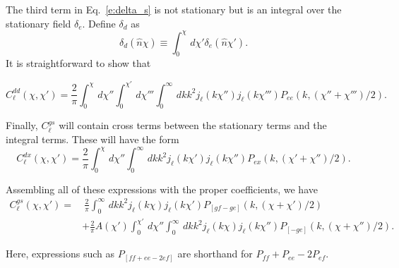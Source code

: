 \documentclass[twocolumn,nofootinbib,prl,floatfix]{revtex4-1}
\newcommand{\ud}{\,d}
\begin{document}
The third term in Eq.~\ref{e:delta_s} is not stationary but is an integral
over the stationary field $\delta_e$.
Define $\delta_d$ as
\begin{equation}
    \delta_d(\hat n \chi) \equiv \int_0^\chi \ud \chi' \delta_e(\hat n \chi').
\end{equation}
It is straightforward to show that
\begin{widetext}
\begin{equation}
C^{dd}_\ell(\chi,\chi')
    =
    \frac{2}{\pi}
    \int_0^\chi\ud\chi''
    \int_0^{\chi'}\ud\chi'''
    \int_0^\infty\ud k k^2 j_\ell(k\chi'') j_{\ell}(k\chi''')
    P_{ee}(k, (\chi''+\chi''')/2).
\end{equation}

Finally, $C^{gs}_\ell$ will contain cross terms between the stationary terms
and the integral terms.  These will have the form
\begin{equation}
C^{dx}_\ell(\chi,\chi')
    =
    \frac{2}{\pi}
    \int_0^\chi\ud\chi''
    \int_0^\infty\ud k k^2 
    j_\ell(k\chi') j_{\ell}(k\chi'')P_{ex}(k, (\chi' + \chi'')/2).
\end{equation}

Assembling all of these expressions with the proper coefficients, we have
\begin{align}
    \label{e:Clss}
C^{gs}_\ell(\chi,\chi') = &~
    \frac{2}{\pi}
    \int_0^\infty\ud k k^2
    j_\ell(k\chi) j_{\ell}(k\chi')
    P_{[gf - ge]}(k, (\chi + \chi')/2)
    \nonumber\\
    & +
    \frac{2}{\pi}
    A(\chi')
    \int_0^{\chi'}\ud\chi''
    \int_0^\infty\ud k k^2 
    j_\ell(k\chi) j_{\ell}(k\chi'')
    P_{[-ge]}(k, (\chi + \chi'')/2).
\end{align}
\end{widetext}
Here, expressions such as $P_{[ff + ee - 2ef]}$ are shorthand for $P_{ff} +
P_{ee} - 2P_{ef}$.
\end{document}
